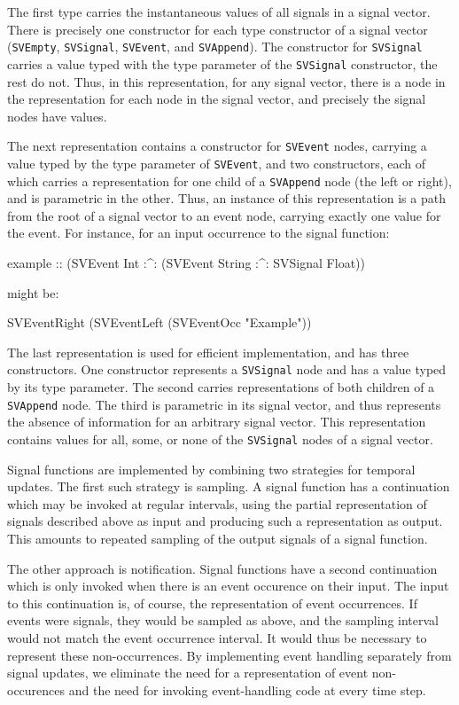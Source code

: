 The first type carries the instantaneous values of all signals in a signal
vector. There is precisely one constructor for each type constructor of a signal
vector ({\tt SVEmpty}, {\tt SVSignal}, {\tt SVEvent}, and {\tt SVAppend}). The
constructor for {\tt SVSignal} carries a value typed with the type parameter of
the {\tt SVSignal} constructor, the rest do not. Thus, in this representation,
for any signal vector, there is a node in the representation for each node in
the signal vector, and precisely the signal nodes have values.

The next representation contains a constructor for {\tt SVEvent} nodes, carrying
a value typed by the type parameter of {\tt SVEvent}, and two constructors, each
of which carries a representation for one child of a {\tt SVAppend} node (the
left or right), and is parametric in the other. Thus, an instance of this
representation is a path from the root of a signal vector to an event node,
carrying exactly one value for the event. For instance, for an input occurrence
to the signal function:

\begin{code}
example :: (SVEvent Int :^: (SVEvent String :^: SVSignal Float))
\end{code}

might be:

\begin{code}
SVEventRight (SVEventLeft (SVEventOcc "Example"))
\end{code}

The last representation is used for efficient implementation, and has three
constructors. One constructor represents a {\tt SVSignal} node and has a value
typed by its type parameter. The second carries representations of both
children of a {\tt SVAppend} node. The third is parametric in its signal vector,
and thus represents the absence of information for an arbitrary signal vector.
This representation contains values for all, some, or none of the {\tt SVSignal}
nodes of a signal vector.

Signal functions are implemented by combining two strategies for temporal
updates. The first such strategy is sampling. A signal function has a 
continuation which may be invoked at regular intervals, using the partial
representation of signals described above as input and producing such a
representation as output. This amounts to repeated sampling of the output
signals of a signal function.

The other approach is notification. Signal functions have a second continuation
which is only invoked when there is an event occurence on their input. The input
to this continuation is, of course, the representation of event occurrences. If
events were signals, they would be sampled as above, and the sampling interval
would not match the event occurrence interval. It would thus be necessary to
represent these non-occurrences. By implementing event handling separately from
signal updates, we eliminate the need for a representation of event
non-occurences and the need for invoking event-handling code at every time step.

